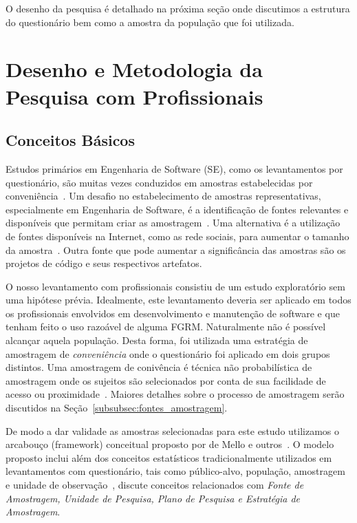 O desenho da pesquisa é detalhado na próxima seção onde discutimos a estrutura
do questionário bem como a amostra da população que foi utilizada.

\section{Desenho e Metodologia da Pesquisa com Profissionais}
\label{sec:desenho_da_pesquisa_com_profissionais}

\subsection{Conceitos Básicos}

Estudos primários em Engenharia de Software (SE), como os levantamentos por
questionário, são muitas vezes conduzidos em amostras estabelecidas por
conveniência~\cite{sjoberg2005survey, dybaa2006systematic}. Um desafio no
estabelecimento de amostras representativas, especialmente em Engenharia de
Software, é a identificação de fontes relevantes e disponíveis que permitam
criar as amostragem~\cite{de2014towards}. Uma alternativa é a utilização de
fontes disponíveis na Internet, como as rede sociais, para aumentar o tamanho da
amostra~\cite{de2013would}. Outra fonte que pode aumentar a significância das
amostras são os projetos de código e seus respectivos artefatos.

O nosso levantamento com profissionais consistiu de um estudo exploratório sem
uma hipótese prévia. Idealmente, este levantamento deveria ser aplicado em todos
os profissionais envolvidos em desenvolvimento e manutenção de software e que
tenham feito o uso razoável de alguma FGRM. Naturalmente não é possível alcançar
aquela população. Desta forma, foi utilizada uma estratégia de amostragem de
\textit{conveniência} onde o questionário foi aplicado em dois grupos distintos.
Uma amostragem de conivência é técnica não probabilística de amostragem onde os
sujeitos são selecionados por conta de sua facilidade de acesso ou
proximidade~\cite{etikan2016comparison}. Maiores detalhes sobre o processo de
amostragem serão discutidos na Seção~\ref{subsubsec:fontes_amostragem}.

De modo a dar validade as amostras selecionadas para este estudo utilizamos o
arcabouço (framework) conceitual proposto por de Mello e
outros~\cite{de2014towards}. O modelo proposto inclui além dos conceitos
estatísticos tradicionalmente utilizados em levantamentos com questionário, tais
como público-alvo, população, amostragem e unidade de
observação~\cite{thompson2012sampling}, discute conceitos relacionados com
\textit{Fonte de Amostragem, Unidade de Pesquisa, Plano de Pesquisa e Estratégia
	de Amostragem}.

